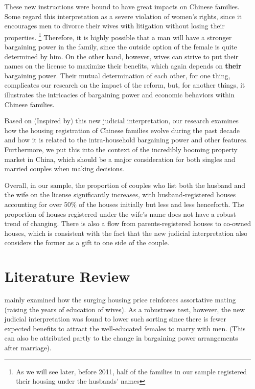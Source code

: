 \documentclass[11pt]{article}
\begin{document}
These new instructions were bound to have great impacts on Chinese families. Some regard this interpretation as a severe violation of women's rights, since it encourages men to divorce their wives with litigation without losing their properties. \footnote{As we will see later, before 2011, half of the families in our sample registered their housing under the husbands' names} Therefore, it is highly possible that a man will have a stronger bargaining power in the family, since the outside option of the female is quite determined by him. On the other hand, however, wives can strive to put their names on the license to maximize their benefits, which again depends on \textbf{their} bargaining power. Their mutual determination of each other, for one thing, complicates our research on the impact of the reform, but, for another things, it illustrates the intricacies of bargaining power and economic behaviors within Chinese families.

Based on (Inspired by) this new judicial interpretation, our research examines how the housing registration of Chinese families evolve during the past decade and how it is related to the intra-household bargaining power and other features. Furthermore, we put this into the context of the incredibly booming property market in China, which should be a major consideration for both singles and married couples when making decisions.

Overall, in our sample, the proportion of couples who list both the husband and the wife on the license significantly increases, with husband-registered houses accounting for over 50\% of the houses initially but less and less henceforth. The proportion of houses registered under the wife's name does not have a robust trend of changing. There is also a flow from parents-registered houses to co-owned houses, which is consistent with the fact that the new judicial interpretation also considers the former as a gift to one side of the couple.

\section{Literature Review} \label{sec:literature}
\citet{SUN2020102492} mainly examined how the surging housing price reinforces assortative mating (raising the years of education of wives). As a robustness test, however, the new judicial interpretation was found to lower such sorting since there is fewer expected benefits to attract the well-educated females to marry with men. (This can also be attributed partly to the change in bargaining power arrangements after marriage).
\end{document}
